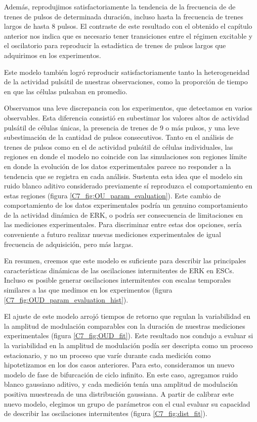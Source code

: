 \documentclass[./main.tex]{subfiles}
\begin{document}
Además, reprodujimos satisfactoriamente la tendencia de la frecuencia de de trenes de pulsos de determinada duración, incluso hasta la frecuencia de trenes largos de hasta 8 pulsos. El contraste de este resultado con el obtenido el capítulo anterior nos indica que es necesario tener transiciones entre el régimen excitable y el oscilatorio para reproducir la estadística de trenes de pulsos largos que adquirimos en los experimentos. 

Este modelo también logró reproducir satisfactoriamente tanto la heterogeneidad de la actividad pulsátil de nuestras observaciones, como la proporción de tiempo en que las células pulsaban en promedio. 

Observamos una leve discrepancia con los experimentos, que detectamos en varios observables. Esta diferencia consistió en subestimar los valores altos de actividad pulsátil de células únicas, la presencia de trenes de 9 o más pulsos, y una leve subestimación de la cantidad de pulsos consecutivos. Tanto en el análisis de trenes de pulsos como en el de actividad pulsátil de células individuales, las regiones en donde el modelo no coincide con las simulaciones son regiones límite en donde la evolución de los datos experimentales parece no responder a la tendencia que se registra en cada análisis. Sustenta esta idea que el modelo sin ruido blanco aditivo considerado previamente sí reproduzca el comportamiento en estas regiones (figura \ref{C7_fig:OU_param_evaluation}). Este cambio de comportamiento de los datos experimentales podría un genuino comportamiento de la actividad dinámica de ERK, o podría ser consecuencia de limitaciones en las mediciones experimentales. Para discriminar entre estas dos opciones, sería conveniente a futuro realizar nuevas mediciones experimentales de igual frecuencia de adquisición, pero más largas. 

En resumen, creemos que este modelo es suficiente para describir las principales características dinámicas de las oscilaciones intermitentes de ERK en ESCs. Incluso es posible generar oscilaciones intermitentes con escalas temporales similares a las que medimos en los experimentos (figura \ref{C7_fig:OUD_param_evaluation_hist}). 

El ajuste de este modelo arrojó tiempos de retorno que regulan la variabilidad en la amplitud de modulación comparables con la duración de nuestras mediciones experimentales (figura \ref{C7_fig:OUD_fit}). Este resultado nos condujo a evaluar si la variabilidad en la amplitud de modulación podía ser descripta como un proceso estacionario, y no un proceso que varíe durante cada medición como hipotetizamos en los dos casos anteriores.  Para esto, consideramos un nuevo modelo de fase de bifurcación de ciclo infinito. En este caso, agregamos ruido blanco gaussiano aditivo, y cada medición tenía una amplitud de modulación positiva muestreada de una distribución gaussiana. A partir de calibrar este nuevo modelo, elegimos un grupo de parámetros con el cual evaluar su capacidad de describir las oscilaciones intermitentes (figura \ref{C7_fig:dist_fit}).
\end{document}
